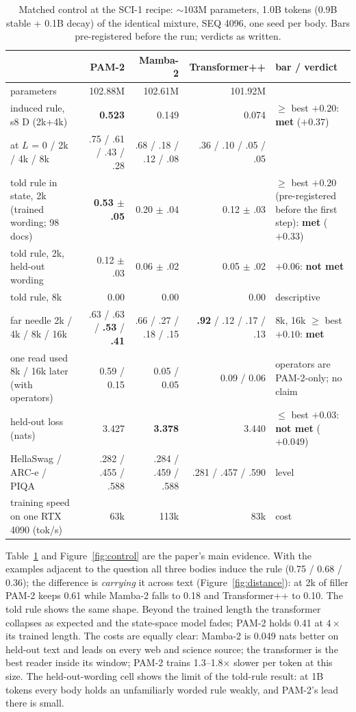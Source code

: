 \documentclass[11pt]{article}
\newcommand{\arch}{PAM-2}
\newcommand{\tpp}{Transformer++}
\newcommand{\mamba}{Mamba-2}
\newcommand{\scione}{SCI-1}
\begin{document}
\begin{table}[t]\centering\small
\caption{Matched control at the \scione{} recipe: $\sim$103M parameters, 1.0B tokens (0.9B stable + 0.1B decay) of the identical mixture, SEQ 4096, one seed per body. Bars pre-registered before the run; verdicts as written.}
\label{tab:control}
\begin{tabular}{lrrr|l}
\toprule
 & \arch & \mamba & \tpp & bar / verdict \\
\midrule
parameters & 102.88M & 102.61M & 101.92M & \\
induced rule, s8 D (2k+4k) & \textbf{0.523} & 0.149 & 0.074 & $\ge$ best $+0.20$: \textbf{met} ($+0.37$) \\
\quad at $L$ = 0 / 2k / 4k / 8k & .75 / .61 / .43 / .28 & .68 / .18 / .12 / .08 & .36 / .10 / .05 / .05 & \\
told rule in state, 2k (trained wording; 98 docs) & \textbf{0.53 $\pm$ .05} & 0.20 $\pm$ .04 & 0.12 $\pm$ .03 & $\ge$ best $+0.20$ (pre-registered before the first step): \textbf{met} ($+0.33$) \\
told rule, 2k, held-out wording & 0.12 $\pm$ .03 & 0.06 $\pm$ .02 & 0.05 $\pm$ .02 & $+0.06$: \textbf{not met} \\
told rule, 8k & 0.00 & 0.00 & 0.00 & descriptive \\
far needle 2k / 4k / 8k / 16k & .63 / .63 / \textbf{.53} / \textbf{.41} & .66 / .27 / .18 / .15 & \textbf{.92} / .12 / .17 / .13 & 8k, 16k $\ge$ best $+0.10$: \textbf{met} \\
one read used 8k / 16k later (with operators) & 0.59 / 0.15 & 0.05 / 0.05 & 0.09 / 0.06 & operators are \arch-only; no claim \\
held-out loss (nats) & 3.427 & \textbf{3.378} & 3.440 & $\le$ best $+0.03$: \textbf{not met} ($+0.049$) \\
HellaSwag / ARC-e / PIQA & .282 / .455 / .588 & .284 / .459 / .588 & .281 / .457 / .590 & level \\
training speed on one RTX 4090 (tok/s) & 63k & 113k & 83k & cost \\
\bottomrule
\end{tabular}
\end{table}

Table~\ref{tab:control} and Figure~\ref{fig:control} are the paper's main evidence. With the examples adjacent to the question all three bodies induce the rule (0.75 / 0.68 / 0.36); the difference is \emph{carrying} it across text (Figure~\ref{fig:distance}): at 2k of filler \arch{} keeps 0.61 while \mamba{} falls to 0.18 and \tpp{} to 0.10. The told rule shows the same shape. Beyond the trained length the transformer collapses as expected and the state-space model fades; \arch{} holds 0.41 at $4\times$ its trained length. The costs are equally clear: \mamba{} is 0.049 nats better on held-out text and leads on every web and science source; the transformer is the best reader inside its window; \arch{} trains 1.3--1.8$\times$ slower per token at this size. The held-out-wording cell shows the limit of the told-rule result: at 1B tokens every body holds an unfamiliarly worded rule weakly, and \arch's lead there is small.
\end{document}
